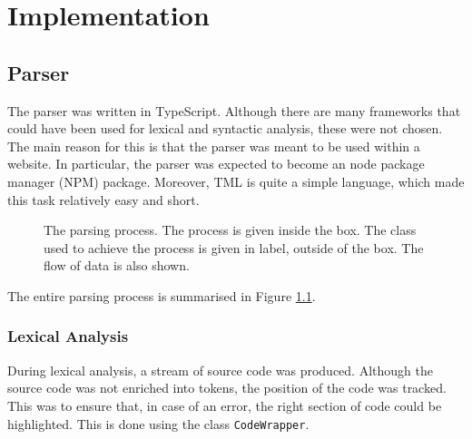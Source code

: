 \chapter{Implementation}
\section{Parser}

The parser was written in TypeScript. Although there are many frameworks that could have been used for lexical and syntactic analysis, these were not chosen. The main reason for this is that the parser was meant to be used within a website. In particular, the parser was expected to become an node package manager (NPM) package. Moreover, TML is quite a simple language, which made this task relatively easy and short.

\begin{figure}[htb]
    \centering
    \caption{The parsing process. The process is given inside the box. The class used to achieve the process is given in label, outside of the box. The flow of data is also shown.}
    \label{fig:parsing_process}
\end{figure}

The entire parsing process is summarised in Figure \ref{fig:parsing_process}.


\subsection{Lexical Analysis}

During lexical analysis, a stream of source code was produced. Although the source code was not enriched into tokens, the position of the code was tracked. This was to ensure that, in case of an error, the right section of code could be highlighted. This is done using the class \texttt{CodeWrapper}. 

